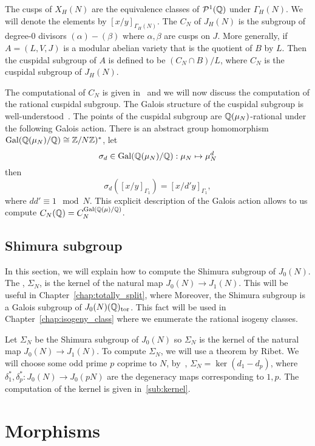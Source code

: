 The cusps of $X_H(N)$ are the equivalence classes of $\mathcal{P}^1(\mathbb{Q})$ under
$\Gamma_H(N)$. We will denote the elements by $[x/y]_{\Gamma_H(N)}$. The
 $C_N$ of $J_H(N)$ is the subgroup of degree-0 divisors
$(\alpha)-(\beta)$ where $\alpha, \beta$ are cusps on $J$. More generally, if
$A=(L, V, J)$ is a modular abelian variety that is the quotient of $B$ by $L$.
Then the cuspidal subgroup of $A$ is defined to be $(C_N\cap B)/L$, where $C_N$ is
the cuspidal subgroup of $J_H(N)$.

The computational of $C_N$ is given in~\cite[\S 3.8]{stein:phd} and we will now
discuss the computation of the rational cuspidal subgroup. The Galois structure
of the cuspidal subgroup is well-understood~\cite[\S 1.3]{stevens:thesis}. The
points of the cuspidal subgroup are $\mathbb{Q}(\mu_N)$-rational under the following
Galois action. There is an abstract group homomorphism
$\operatorname{Gal}(\mathbb{Q}(\mu_N)/\mathbb{Q})\cong \mathbb{Z}/N\mathbb{Z})^*$, let
\[
    \sigma_d\in \operatorname{Gal}(\mathbb{Q}(\mu_N)/\mathbb{Q}):\mu_N\mapsto \mu_N ^d
\]
then
\[
    \sigma_d([x/y]_{\Gamma_1})=[x/d'y]_{\Gamma_1},
\]
where $dd'\equiv 1 \mod{N}$. This explicit description of the Galois action
allows to us compute $C_N(\mathbb{Q})=C_N ^{\operatorname{Gal}(\mathbb{Q}(\mu)/\mathbb{Q})}$.

\subsection{Shimura subgroup}%
\label{sub:shimura}

In this section, we will explain how to compute the Shimura subgroup of
$J_0(N)$. The , $\Sigma_N$, is the kernel of the natural
map $J_0(N)\to J_1(N)$. This will be useful in
Chapter~\ref{chap:totally_split}, where Moreover, the Shimura subgroup is a
Galois subgroup of $J_0(N)(\mathbb{Q})_{\mathrm{tor}}$. This fact will be used in
Chapter~\ref{chap:isogeny_class} where we enumerate the rational isogeny
classes.

Let $\Sigma_N$ be the Shimura subgroup of $J_0(N)$ so $\Sigma_N$ is the kernel
of the natural map $J_0(N)\to J_1(N)$. To compute $\Sigma_N$, we will use a
theorem by Ribet. We will choose some odd prime $p$ coprime to $N$,
by~\cite[Prop. 1]{ribet:raising}, $\Sigma_N=\ker(d_1-d_p)$, where $\delta_1
^*,\delta_p ^*:J_0(N)\to J_0(pN)$ are the degeneracy maps corresponding to
$1,p$. The computation of the kernel is given in~\ref{sub:kernel}.

\section{Morphisms}%
\label{sec:morphisms}


